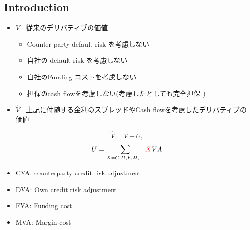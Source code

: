 \documentclass[driverfallback=dvipdfmx,cjk]{beamer}
\begin{document}
\subsection{Introduction}
\begin{frame} 
    \begin{itemize}
        \item $V$ : 従来のデリバティブの価値
            \begin{itemize}
                \item Counter party default risk を考慮しない
                \item 自社の default risk を考慮しない
                \item 自社のFunding コストを考慮しない
                \item 担保のcash flowを考慮しない(考慮したとしても完全担保 )
            \end{itemize}
        \item $\hat{V}$ : 上記に付随する金利のスプレッドやCash flowを考慮したデリバティブの価値
    \end{itemize}
    $$\hat{V} = V + U, $$
    $$U = \sum_{X=C, D, F, M, ...} \textcolor{red}{X}VA$$
    \begin{itemize}
        \item CVA: counterparty credit risk adjustment
        \item DVA: Own credit risk adjustment
        \item FVA: Funding cost
        \item MVA: Margin cost
    \end{itemize}
\end{frame}
\end{document}
